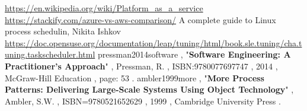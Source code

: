 \begin{thebibliography}{8}
\latin
\url{https://en.wikipedia.org/wiki/Platform_as_a_service}
\url{https://stackify.com/azure-vs-aws-comparison/}
A complete guide to Linux process schedulin, Nikita Ishkov
\url{https://doc.opensuse.org/documentation/leap/tuning/html/book.sle.tuning/cha.tuning.taskscheduler.html}
pressman2014software ,
"\textbf{Software Engineering: A Practitioner's Approach}" ,
Pressman, R. ,
  ISBN:9780077697747 , 
2014 ,
McGraw-Hill Education ,
page: 53 .
ambler1999more ,
"\textbf{More Process Patterns: Delivering Large-Scale Systems Using Object Technology}" ,
Ambler, S.W. ,
ISBN=9780521652629 ,
1999 ,
Cambridge University Press .



\end{thebibliography}




